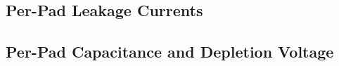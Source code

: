 \subsection{Per-Pad Leakage Currents}
\label{subsec:QA_Ipad}

\subsection{Per-Pad Capacitance and Depletion Voltage}
\label{subsec:QA_Vdep}

